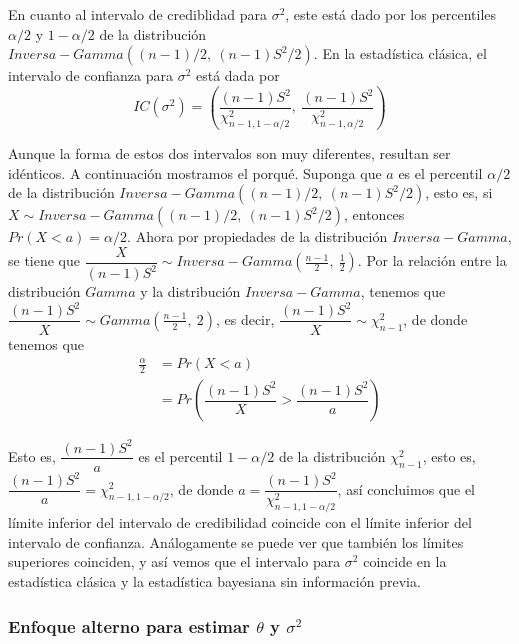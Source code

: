 \documentclass[
  10pt,
  spanish,
]{book}
\theoremstyle{definition}
\theoremstyle{definition}
\theoremstyle{definition}
\theoremstyle{definition}
\theoremstyle{remark}
\begin{document}
En cuanto al intervalo de crediblidad para \(\sigma^2\), este está dado por los percentiles \(\alpha/2\) y \(1-\alpha/2\) de la distribución \(Inversa-Gamma((n-1)/2,\ (n-1)S^2/2)\). En la estadística clásica, el intervalo de confianza para \(\sigma^2\) está dada por \begin{equation*}
IC(\sigma^2)=\left(\dfrac{(n-1)S^2}{\chi^2_{n-1,1-\alpha/2}},\ \dfrac{(n-1)S^2}{\chi^2_{n-1,\alpha/2}}\right)
\end{equation*}

Aunque la forma de estos dos intervalos son muy diferentes, resultan ser idénticos. A continuación mostramos el porqué. Suponga que \(a\) es el percentil \(\alpha/2\) de la distribución \(Inversa-Gamma((n-1)/2,\ (n-1)S^2/2)\), esto es, si \(X\sim Inversa-Gamma((n-1)/2,\ (n-1)S^2/2)\), entonces \(Pr(X<a)=\alpha/2\). Ahora por propiedades de la distribución \(Inversa-Gamma\), se tiene que \(\dfrac{X}{(n-1)S^2}\sim Inversa-Gamma(\frac{n-1}{2},\ \frac{1}{2})\). Por la relación entre la distribución \(Gamma\) y la distribución \(Inversa-Gamma\), tenemos que \(\dfrac{(n-1)S^2}{X}\sim Gamma(\frac{n-1}{2},\ 2)\), es decir, \(\dfrac{(n-1)S^2}{X}\sim\chi^2_{n-1}\), de donde tenemos que
\begin{align*}
\frac{\alpha}{2}&=Pr(X<a)\\
&=Pr\left(\dfrac{(n-1)S^2}{X}>\dfrac{(n-1)S^2}{a}\right)
\end{align*}

Esto es, \(\dfrac{(n-1)S^2}{a}\) es el percentil \(1-\alpha/2\) de la distribución \(\chi^2_{n-1}\), esto es, \(\dfrac{(n-1)S^2}{a}=\chi^2_{n-1,1-\alpha/2}\), de donde \(a=\dfrac{(n-1)S^2}{\chi^2_{n-1,1-\alpha/2}}\), así concluimos que el límite inferior del intervalo de credibilidad coincide con el límite inferior del intervalo de confianza. Análogamente se puede ver que también los límites superiores coinciden, y así vemos que el intervalo para \(\sigma^2\) coincide en la estadística clásica y la estadística bayesiana sin información previa.

\hypertarget{enfoque-alterno-para-estimar-theta-y-sigma2}{%
\subsubsection*{\texorpdfstring{Enfoque alterno para estimar \(\theta\) y \(\sigma^2\)}{Enfoque alterno para estimar \textbackslash theta y \textbackslash sigma\^{}2}}\label{enfoque-alterno-para-estimar-theta-y-sigma2}}
\end{document}
